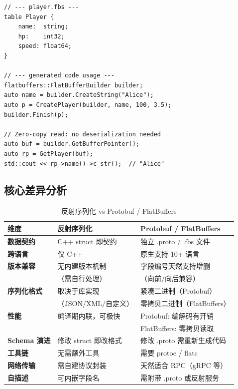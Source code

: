 \documentclass[12pt,a4paper,fontset=fandol]{ctexbook}
\begin{document}
\begin{lstlisting}[caption={FlatBuffers: Schema 优先 + 零拷贝}]
// --- player.fbs ---
table Player {
    name:  string;
    hp:    int32;
    speed: float64;
}

// --- generated code usage ---
flatbuffers::FlatBufferBuilder builder;
auto name = builder.CreateString("Alice");
auto p = CreatePlayer(builder, name, 100, 3.5);
builder.Finish(p);

// Zero-copy read: no deserialization needed
auto buf = builder.GetBufferPointer();
auto rp = GetPlayer(buf);
std::cout << rp->name()->c_str();  // "Alice"
\end{lstlisting}

\subsection{核心差异分析}

\begin{table}[H]
\centering
\caption{反射序列化 vs Protobuf / FlatBuffers}
\begin{tabular}{l >{\raggedright\arraybackslash}p{4cm} >{\raggedright\arraybackslash}p{4cm}}
\toprule
\textbf{维度} & \textbf{反射序列化} & \textbf{Protobuf / FlatBuffers} \\
\midrule
\textbf{数据契约} & C++ struct 即契约 & 独立 .proto / .fbs 文件 \\
\addlinespace
\textbf{跨语言} & 仅 C++ & 原生支持 10+ 语言 \\
\addlinespace
\textbf{版本兼容} & 无内建版本机制 & 字段编号天然支持增删 \\
  & （需自行处理） & （向前/向后兼容） \\
\addlinespace
\textbf{序列化格式} & 取决于库实现 & 紧凑二进制（Protobuf） \\
  & （JSON/XML/自定义） & 零拷贝二进制（FlatBuffers） \\
\addlinespace
\textbf{性能} & 编译期内联，可极快 & Protobuf: 编解码有开销 \\
  & & FlatBuffers: 零拷贝读取 \\
\addlinespace
\textbf{Schema 演进} & 修改 struct 即改格式 & 修改 .proto 需重新生成代码 \\
\addlinespace
\textbf{工具链} & 无需额外工具 & 需要 protoc / flatc \\
\addlinespace
\textbf{网络传输} & 需自建协议封装 & 天然适合 RPC（gRPC 等） \\
\addlinespace
\textbf{自描述} & 可内嵌字段名 & 需附带 .proto 或反射服务 \\
\bottomrule
\end{tabular}
\end{table}
\end{document}
